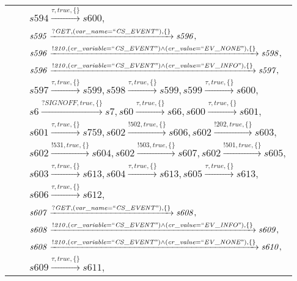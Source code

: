 \begin{tabular}{lcp{350px}}
& & $\mathit{s594}\xrightarrow{\mathit{\tau}, \mathit{true}, \{\}}\mathit{s600},$ \\
& & $\mathit{s595}\xrightarrow{\mathit{?GET}, \mathit{(var\_name = ``CS\_EVENT")}, \{\}}\mathit{s596},$ \\
& & $\mathit{s596}\xrightarrow{\mathit{!210}, \mathit{(cr\_variable = ``CS\_EVENT") \land (cr\_value = ``EV\_NONE")}, \{\}}\mathit{s598},$ \\
& & $\mathit{s596}\xrightarrow{\mathit{!210}, \mathit{(cr\_variable = ``CS\_EVENT") \land (cr\_value = ``EV\_INFO")}, \{\}}\mathit{s597},$ \\
& & $\mathit{s597}\xrightarrow{\mathit{\tau}, \mathit{true}, \{\}}\mathit{s599},\mathit{s598}\xrightarrow{\mathit{\tau}, \mathit{true}, \{\}}\mathit{s599},\mathit{s599}\xrightarrow{\mathit{\tau}, \mathit{true}, \{\}}\mathit{s600},$ \\
& & $\mathit{s6}\xrightarrow{\mathit{?SIGNOFF}, \mathit{true}, \{\}}\mathit{s7},\mathit{s60}\xrightarrow{\mathit{\tau}, \mathit{true}, \{\}}\mathit{s66},\mathit{s600}\xrightarrow{\mathit{\tau}, \mathit{true}, \{\}}\mathit{s601},$ \\
& & $\mathit{s601}\xrightarrow{\mathit{\tau}, \mathit{true}, \{\}}\mathit{s759},\mathit{s602}\xrightarrow{\mathit{!502}, \mathit{true}, \{\}}\mathit{s606},\mathit{s602}\xrightarrow{\mathit{!202}, \mathit{true}, \{\}}\mathit{s603},$ \\
& & $\mathit{s602}\xrightarrow{\mathit{!531}, \mathit{true}, \{\}}\mathit{s604},\mathit{s602}\xrightarrow{\mathit{!503}, \mathit{true}, \{\}}\mathit{s607},\mathit{s602}\xrightarrow{\mathit{!501}, \mathit{true}, \{\}}\mathit{s605},$ \\
& & $\mathit{s603}\xrightarrow{\mathit{\tau}, \mathit{true}, \{\}}\mathit{s613},\mathit{s604}\xrightarrow{\mathit{\tau}, \mathit{true}, \{\}}\mathit{s613},\mathit{s605}\xrightarrow{\mathit{\tau}, \mathit{true}, \{\}}\mathit{s613},$ \\
& & $\mathit{s606}\xrightarrow{\mathit{\tau}, \mathit{true}, \{\}}\mathit{s612},$ \\
& & $\mathit{s607}\xrightarrow{\mathit{?GET}, \mathit{(var\_name = ``CS\_EVENT")}, \{\}}\mathit{s608},$ \\
& & $\mathit{s608}\xrightarrow{\mathit{!210}, \mathit{(cr\_variable = ``CS\_EVENT") \land (cr\_value = ``EV\_INFO")}, \{\}}\mathit{s609},$ \\
& & $\mathit{s608}\xrightarrow{\mathit{!210}, \mathit{(cr\_variable = ``CS\_EVENT") \land (cr\_value = ``EV\_NONE")}, \{\}}\mathit{s610},$ \\
& & $\mathit{s609}\xrightarrow{\mathit{\tau}, \mathit{true}, \{\}}\mathit{s611},$ \\
\end{tabular}

